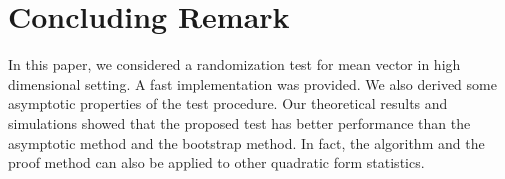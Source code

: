 \documentclass[3p]{elsarticle}
\DeclareMathOperator{\mydiag}{diag}
\newcommand{\BP}{\mathbf{P}}
\theoremstyle{plain}
\theoremstyle{definition}
\theoremstyle{remark}
\begin{document}
%







\section{Concluding Remark}
In this paper, we considered a randomization test for mean vector in high dimensional setting.
A fast implementation was provided.
We also derived some asymptotic properties of the test procedure.
Our theoretical results and simulations showed that the proposed test has better performance than the asymptotic method and the bootstrap method.
 In fact, the algorithm and the proof method can also be applied to other quadratic form statistics.
\end{document}
